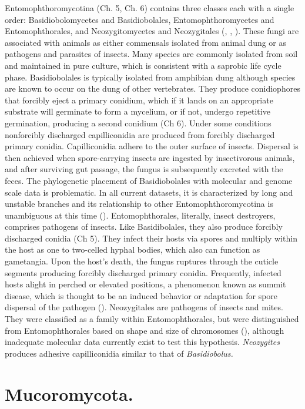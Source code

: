 \documentclass[]{book}
\begin{document}
Entomophthoromycotina (Ch. 5, Ch. 6) contains three classes each with a
single order: Basidiobolomycetes and Basidiobolales,
Entomophthoromycetes and Entomophthorales, and Neozygitomycetes and
Neozygitales (\citet{Humber_2012}, \citet{Benny_2014},
\citet{Spatafora_2016}). These fungi are associated with animals as
either commensals isolated from animal dung or as pathogens and
parasites of insects. Many species are commonly isolated from soil and
maintained in pure culture, which is consistent with a saprobic life
cycle phase. Basidiobolales is typically isolated from amphibian dung
although species are known to occur on the dung of other vertebrates.
They produce conidiophores that forcibly eject a primary conidium, which
if it lands on an appropriate substrate will germinate to form a
mycelium, or if not, undergo repetitive germination, producing a second
conidium (Ch 6). Under some conditions nonforcibly discharged
capilliconidia are produced from forcibly discharged primary conidia.
Capilliconidia adhere to the outer surface of insects. Dispersal is then
achieved when spore-carrying insects are ingested by insectivorous
animals, and after surviving gut passage, the fungus is subsequently
excreted with the feces. The phylogenetic placement of Basidiobolales
with molecular and genome scale data is problematic. In all current
datasets, it is characterized by long and unstable branches and its
relationship to other Entomophthoromycotina is unambiguous at this time
(\citet{Gryganskyi_2012}). Entomophthorales, literally, insect
destroyers, comprises pathogens of insects. Like Basidibolales, they
also produce forcibly discharged conidia (Ch 5). They infect their hosts
via spores and multiply within the host as one to two-celled hyphal
bodies, which also can function as gametangia. Upon the host's death,
the fungus ruptures through the cuticle segments producing forcibly
discharged primary conidia. Frequently, infected hosts alight in perched
or elevated positions, a phenomenon known as summit disease, which is
thought to be an induced behavior or adaptation for spore dispersal of
the pathogen (\citet{Gryganskyi_2017}). Neozygitales are pathogens of
insects and mites. They were classified as a family within
Entomophthorales, but were distinguished from Entomophthorales based on
shape and size of chromosomes (\citet{Humber_2012}), although inadequate
molecular data currently exist to test this hypothesis.
\emph{Neozygites} produces adhesive capilliconidia similar to that of
\emph{Basidiobolus.}

\section{Mucoromycota.}\label{mucoromycota.}
\end{document}
